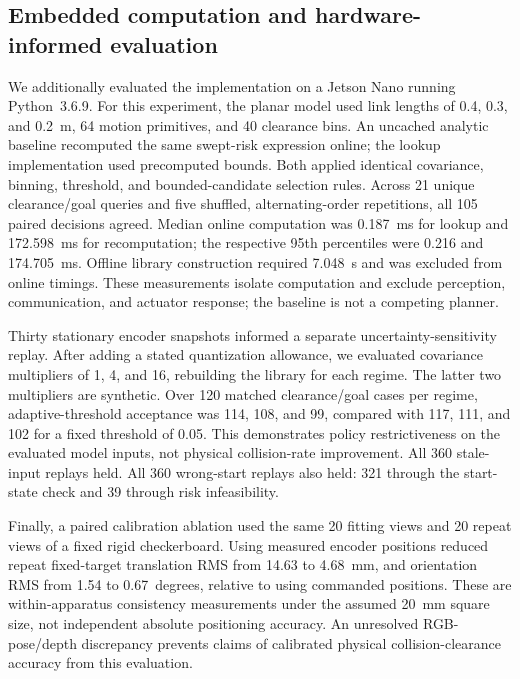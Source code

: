 \subsection{Embedded computation and hardware-informed evaluation}
We additionally evaluated the implementation on a Jetson Nano running Python~3.6.9.
For this experiment, the planar model used link lengths of 0.4, 0.3, and 0.2~m,
64 motion primitives, and 40 clearance bins. An uncached analytic baseline
recomputed the same swept-risk expression online; the lookup implementation
used precomputed bounds. Both applied identical covariance, binning, threshold,
and bounded-candidate selection rules. Across 21 unique clearance/goal queries
and five shuffled, alternating-order repetitions, all 105 paired decisions
agreed. Median online computation was 0.187~ms for lookup and 172.598~ms for
recomputation; the respective 95th percentiles were 0.216 and 174.705~ms.
Offline library construction required 7.048~s and was excluded from online
timings. These measurements isolate computation and exclude perception,
communication, and actuator response; the baseline is not a competing planner.

Thirty stationary encoder snapshots informed a separate uncertainty-sensitivity
replay. After adding a stated quantization allowance, we evaluated covariance
multipliers of 1, 4, and 16, rebuilding the library for each regime. The latter
two multipliers are synthetic. Over 120 matched clearance/goal cases per
regime, adaptive-threshold acceptance was 114, 108, and 99, compared with
117, 111, and 102 for a fixed threshold of 0.05. This demonstrates policy
restrictiveness on the evaluated model inputs, not physical collision-rate
improvement. All 360 stale-input replays held. All 360 wrong-start replays
also held: 321 through the start-state check and 39 through risk infeasibility.

Finally, a paired calibration ablation used the same 20 fitting views and
20 repeat views of a fixed rigid checkerboard. Using measured encoder
positions reduced repeat fixed-target translation RMS from 14.63 to 4.68~mm,
and orientation RMS from 1.54 to 0.67~degrees, relative to using commanded
positions. These are within-apparatus consistency measurements under the
assumed 20~mm square size, not independent absolute positioning accuracy.
An unresolved RGB-pose/depth discrepancy prevents claims of calibrated
physical collision-clearance accuracy from this evaluation.
